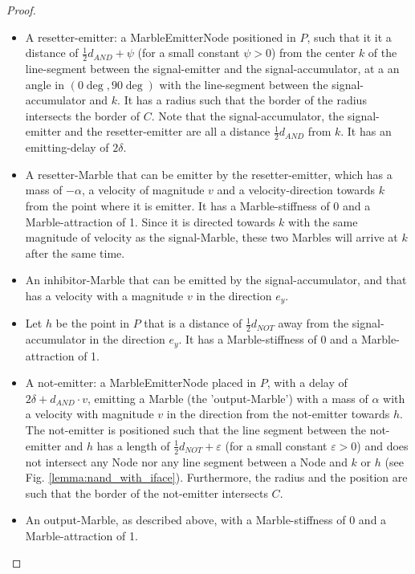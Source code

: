 \begin{proof}
\begin{itemize}
        \item A resetter-emitter: a MarbleEmitterNode positioned in $P$, such that it it a distance of $\frac{1}{2}d_{AND} + \psi$ (for a small constant $\psi > 0$) from the center $k$ of the line-segment between the signal-emitter and the signal-accumulator, at a an angle in $(0 \deg, 90 \deg)$ with the line-segment between the signal-accumulator and $k$. It has a radius such that the border of the radius intersects the border of $C$. Note that the signal-accumulator, the signal-emitter and the resetter-emitter are all a distance $\frac{1}{2}d_{AND}$ from $k$. It has an emitting-delay of $2 \delta$.
        
        \item A resetter-Marble that can be emitter by the resetter-emitter, which has a mass of $-\alpha$, a velocity of magnitude $v$ and a velocity-direction towards $k$ from the point where it is emitter. It has a Marble-stiffness of 0 and a Marble-attraction of 1. Since it is directed towards $k$ with the same magnitude of velocity as the signal-Marble, these two Marbles will arrive at $k$ after the same time.
        
        \item An inhibitor-Marble that can be emitted by the signal-accumulator, and that has a velocity with a magnitude $v$ in the direction $e_y$. 
        \item Let $h$ be the point in $P$ that is a distance of $\frac{1}{2}d_{NOT}$ away from the signal-accumulator in the direction $e_y$. It has a Marble-stiffness of 0 and a Marble-attraction of 1.
        
        \item A not-emitter: a MarbleEmitterNode placed in $P$, with a delay of $2\delta + d_{AND} \cdot v$, emitting a Marble (the 'output-Marble') with a mass of $\alpha$ with a velocity with magnitude $v$ in the direction from the not-emitter towards $h$. The not-emitter is positioned such that the line segment between the not-emitter and $h$ has a length of $\frac{1}{2} d_{NOT} + \varepsilon$ (for a small constant $\varepsilon > 0$) and does not intersect any Node nor any line segment between a Node and $k$ or $h$ (see Fig. \ref{lemma:nand_with_iface}). Furthermore, the radius and the position are such that the border of the not-emitter intersects $C$.
        
        \item An output-Marble, as described above, with a Marble-stiffness of 0 and a Marble-attraction of 1.
        

\end{itemize}
\end{proof}
